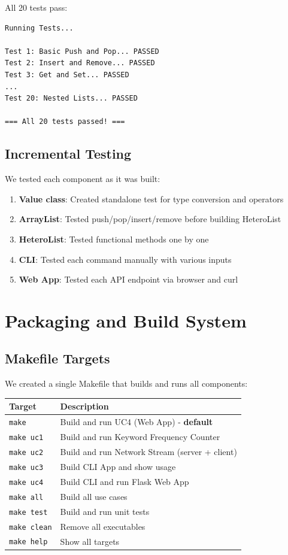 \documentclass[11pt,a4paper]{article}
\begin{document}
All 20 tests pass:

\begin{verbatim}
Running Tests...

Test 1: Basic Push and Pop... PASSED
Test 2: Insert and Remove... PASSED
Test 3: Get and Set... PASSED
...
Test 20: Nested Lists... PASSED

=== All 20 tests passed! ===
\end{verbatim}

\subsection{Incremental Testing}

We tested each component as it was built:
\begin{enumerate}
    \item \textbf{Value class}: Created standalone test for type conversion and operators
    \item \textbf{ArrayList}: Tested push/pop/insert/remove before building HeteroList
    \item \textbf{HeteroList}: Tested functional methods one by one
    \item \textbf{CLI}: Tested each command manually with various inputs
    \item \textbf{Web App}: Tested each API endpoint via browser and curl
\end{enumerate}

\section{Packaging and Build System}

\subsection{Makefile Targets}

We created a single Makefile that builds and runs all components:

\begin{center}
\begin{tabular}{|l|p{9cm}|}
\hline
\textbf{Target} & \textbf{Description} \\
\hline
\texttt{make} & Build and run UC4 (Web App) - \textbf{default} \\
\texttt{make uc1} & Build and run Keyword Frequency Counter \\
\texttt{make uc2} & Build and run Network Stream (server + client) \\
\texttt{make uc3} & Build CLI App and show usage \\
\texttt{make uc4} & Build CLI and run Flask Web App \\
\texttt{make all} & Build all use cases \\
\texttt{make test} & Build and run unit tests \\
\texttt{make clean} & Remove all executables \\
\texttt{make help} & Show all targets \\
\hline
\end{tabular}
\end{center}
\end{document}
